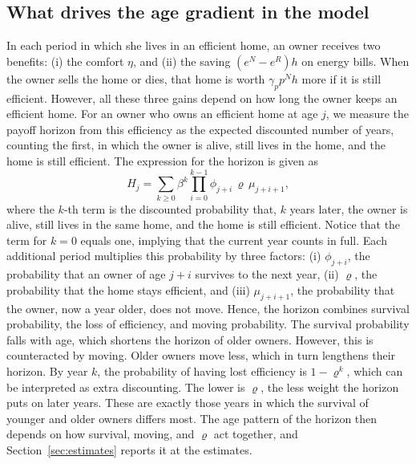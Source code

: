 \subsection{What drives the age gradient in the model}\label{sec:model-forces}

In each period in which she lives in an efficient home, an owner receives two benefits: (i) the
comfort $\eta$, and (ii) the saving  $(e^N-e^R)h$ on energy bills. When the owner sells the
home or dies, that home is worth $\gamma_pp^Nh$ more if it is still
efficient. However, all these three gains depend on how long the owner keeps an efficient home. For an owner who owns an efficient home at age $j$, we measure the 
payoff horizon from this efficiency as the expected discounted number of years, counting
the first, in which the owner is alive, still lives in the home, and the
home is still efficient. The expression for the horizon is given as
\begin{equation}
  H_j=\sum_{k\geq 0}\beta^k\prod_{i=0}^{k-1}\phi_{j+i}\,\varrho\,
  \mu_{j+i+1},
  \label{eq:payoff-horizon}
\end{equation}
where the $k$-th term is the discounted probability that, $k$ years later,
the owner is alive, still lives in the same home, and the home is still
efficient. Notice that  the term for $k=0$ equals one, implying that the current year counts in
full. Each additional period multiplies this probability by three factors: (i)
$\phi_{j+i}$, the probability that an owner of age $j+i$ survives to the
next year, (ii) $\varrho$, the probability that the home stays efficient, and
(iii) $\mu_{j+i+1}$, the probability that the owner, now a year older, does not
move. Hence, the horizon combines survival probability, the loss of efficiency,
and moving probability.  The survival probability falls with age, which shortens the
horizon of older owners. However, this is counteracted by moving. Older owners move
less, which in turn lengthens their horizon. By year $k$, the probability of having lost efficiency
is $1-\varrho^k$, which can be interpreted as extra discounting. The lower is
$\varrho$, the less weight the horizon puts on later years. These are
exactly those years in which the survival of younger and older owners differs most.
 The age pattern of the horizon then depends on how
survival, moving, and $\varrho$ act together, and
Section~\ref{sec:estimates} reports it at the estimates.

